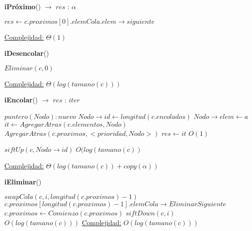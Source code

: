 \begin{algorithm}[H]{\textbf{iPróximo}() $\to$ $res$ : $\alpha$}
    	\begin{algorithmic}[1]
			\State $res \gets c.proximos[0].elemCola.elem \rightarrow siguiente$ 
			
			\medskip
			\Statex \underline{Complejidad:} $\Theta(1)$
    	\end{algorithmic}
\end{algorithm}

\begin{algorithm}[H]{\textbf{iDesencolar}()}
    	\begin{algorithmic}[1]
			\State $Eliminar(c,0)$ 
			
			\medskip
			\Statex \underline{Complejidad:} $\Theta(log(tamano(c)))$
    	\end{algorithmic}
\end{algorithm}

\begin{algorithm}[H]{\textbf{iEncolar}()  $\to$ $res$ : $iter$ }
    	\begin{algorithmic}[1]
			\State $puntero(Nodo): nuevo $ 
			\State $Nodo \rightarrow id \gets longitud(c.encolados)$ 
			\State $Nodo \rightarrow elem \gets a$ 
			\State $it \gets AgregarAtras(c.elementos, Nodo)$ 			
			\State $AgregarAtras(c.proximos,<prioridad, Nodo>)$ 			
			\State $res \gets it$ 
			 \Comment $O(1)$
		
				\State $siftUp(c,Nodo \rightarrow id) $ \Comment $O(log(tamano(c))$	
			
			\EndIf		
			\medskip
			\Statex \underline{Complejidad:} $\Theta(log(tamano(c)) + copy(\alpha))$
    	\end{algorithmic}
\end{algorithm}
    	
\begin{algorithm}[H]{\textbf{iEliminar}()}
    	\begin{algorithmic}[1]
			\State $swapCola(c, i, longitud(c.proximos) - 1)$ 
			\State $c.proximos[longitud(c.proximos) - 1].elemCola \rightarrow EliminarSiguiente$ 
			\State $c.proximos \gets Comienzo(c.proximos)$ 				
			\State $siftDown(c,i) $ \Comment $O(log(tamano(c)))$	
			\medskip
			\Statex \underline{Complejidad:} $O(log(tamano(c)))$
    	\end{algorithmic}
\end{algorithm}

